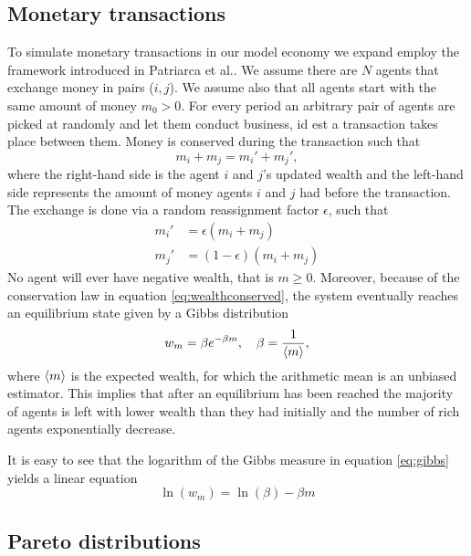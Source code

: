 \documentclass[10pt, a4paper]{amsart}
\begin{document}
\subsection{Monetary transactions}
To simulate monetary transactions in our model economy we expand employ the framework introduced in Patriarca et al.\cite{Patriarca}. We assume there are $N$ agents that exchange money in pairs ($i,j$). We assume also that all agents start with the same amount of money $m_0>0$. For every period an arbitrary pair of agents are picked at randomly and let them conduct business, id est a transaction takes place between them. Money is conserved during the transaction such that
\begin{equation}
\label{eq:wealthconserved}
m_i + m_j = m_i' + m_j',
\end{equation}
where the right-hand side is the agent $i$ and $j$'s updated wealth and the left-hand side represents the amount of money agents $i$ and $j$ had before the transaction. The exchange is done via a random reassignment factor $\epsilon$, such that
\begin{align}
m_i' &= \epsilon (m_i + m_j) \\
m_j' &= (1 - \epsilon) (m_i + m_j)
\end{align}
No agent will ever have negative wealth, that is $m \geq 0$. Moreover, because of the conservation law in equation \ref{eq:wealthconserved}, the system eventually reaches an equilibrium state given by a Gibbs distribution
\begin{equation}
\label{eq:gibbs}
w_m = \beta e^{-\beta m}, \quad \beta = \frac{1}{\ev{m}},
\end{equation}
where $\ev{m}$ is the expected wealth, for which the arithmetic mean is an unbiased estimator. This implies that after an equilibrium has been reached the majority of agents is left with lower wealth than they had initially and
the number of rich agents exponentially decrease.

It is easy to see that the logarithm of the Gibbs measure in equation \ref{eq:gibbs} yields a linear equation
\begin{equation}
\label{eq:lingibbs}
\ln(w_m)=\ln(\beta) - \beta m
\end{equation}

\subsection{Pareto distributions}
\end{document}
